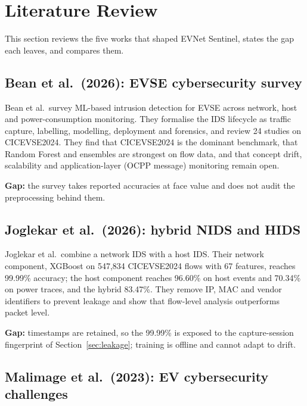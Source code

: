 \documentclass[conference]{IEEEtran}
\begin{document}
\section{Literature Review}
\label{sec:lit}

This section reviews the five works that shaped EVNet Sentinel, states the gap each leaves, and compares them.

\subsection{Bean et al.\ (2026): EVSE cybersecurity survey \cite{b1}}

Bean et al.\ survey ML-based intrusion detection for EVSE across network, host and power-consumption monitoring. They formalise the IDS lifecycle as traffic capture, labelling, modelling, deployment and forensics, and review 24 studies on CICEVSE2024. They find that CICEVSE2024 is the dominant benchmark, that Random Forest and ensembles are strongest on flow data, and that concept drift, scalability and application-layer (OCPP message) monitoring remain open.

\textbf{Gap:} the survey takes reported accuracies at face value and does not audit the preprocessing behind them.

\subsection{Joglekar et al.\ (2026): hybrid NIDS and HIDS \cite{b2}}

Joglekar et al.\ combine a network IDS with a host IDS. Their network component, XGBoost on 547,834 CICEVSE2024 flows with 67 features, reaches 99.99\% accuracy; the host component reaches 96.60\% on host events and 70.34\% on power traces, and the hybrid 83.47\%. They remove IP, MAC and vendor identifiers to prevent leakage and show that flow-level analysis outperforms packet level.

\textbf{Gap:} timestamps are retained, so the 99.99\% is exposed to the capture-session fingerprint of Section~\ref{sec:leakage}; training is offline and cannot adapt to drift.

\subsection{Malimage et al.\ (2023): EV cybersecurity challenges \cite{b3}}
\end{document}
